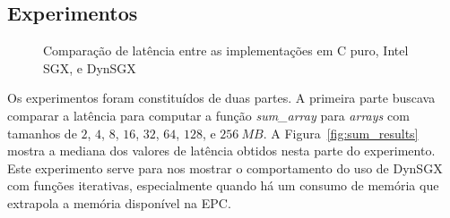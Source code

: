 \subsection{Experimentos}
\label{subsec:dynsgx_avaliacao_experimentos}

\begin{figure}
    \centering
    \hfil
    \caption{Comparação de latência entre as implementações em C puro, Intel
    SGX, e DynSGX}
    \label{fig:exp_results}
\end{figure}

Os experimentos foram constituídos de duas partes. A primeira parte buscava
comparar a latência para computar a função \textit{sum\_array} para \textit
{arrays} com tamanhos de $2$, $4$, $8$, $16$, $32$, $64$, $128$, e $256\ MB$.
A Figura~\ref{fig:sum_results} mostra a mediana dos valores de latência obtidos
nesta parte do experimento. Este experimento serve para nos mostrar o
comportamento do uso de DynSGX com funções iterativas, especialmente quando há
um consumo de memória que extrapola a memória disponível na EPC.

